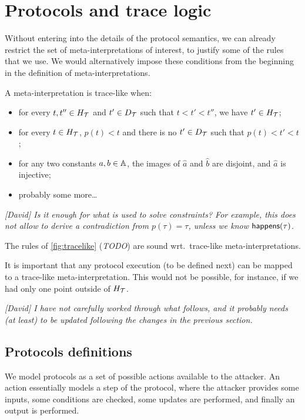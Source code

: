 \section{Protocols and trace logic}

Without entering into the details of the protocol semantics, we can already
restrict the set of meta-interpretations of interest, to justify some of the
rules that we use. We would alternatively impose these conditions from the
beginning in the definition of meta-interpretations.

\begin{definition}
A meta-interpretation is trace-like when:
\begin{itemize}
\item for every $t,t''\in H_{\mathcal{T}}$ and $t'\in D_{\mathcal{T}}$
  such that $t<t'<t''$, we have $t'\in H_{\mathcal{T}}$;
\item for every $t\in H_{\mathcal{T}}$, $p(t) < t$ and there
is no $t'\in D_{\mathcal{T}}$ such that $p(t)<t'<t$;
\item for any two constants $a,b\in\mathbb{A}$,
  the images of $\hat{a}$ and $\hat{b}$ are disjoint,
  and $\hat{a}$ is injective;
\item probably some more\ldots
\end{itemize}
\end{definition}

\emph{[David] Is it enough for what is used to solve constraints?
  For example, this does not allow to derive a contradiction from 
  $p(\tau)=\tau$, unless we know $\textsf{happens}(\tau)$.}

\begin{proposition}
The rules of \cref{fig:tracelike} (\emph{TODO})
are sound wrt.\ trace-like meta-interpretations.
\end{proposition}

It is important that any protocol execution (to be defined next) can be
mapped to a trace-like meta-interpretation. This would not be possible,
for instance, if we had only one point outside of $H_{\mathcal{T}}$.

\emph{[David] I have not carefully worked through what follows, and it
probably needs (at least) to be updated following the changes in the previous
section.}

\subsection{Protocols definitions}
We  model protocols as a set of possible actions available to the
attacker. An action essentially models a step of the protocol, where
the attacker provides some inputs, some conditions are checked, some
updates are performed, and finally an output is performed.

